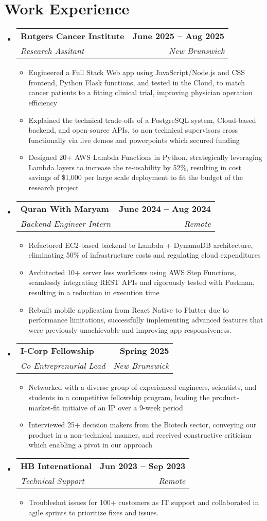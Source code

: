 \documentclass[letterpaper,11pt]{article}
\makeatletter
\newcommand{\resumeItem}[1]{
  \item\small{
    {#1 \vspace{0pt}}
  }
}
\newcommand{\resumeSubheading}[4]{
  \vspace{-2pt}\item
    \begin{tabular*}{1.0\textwidth}[t]{l@{\extracolsep{\fill}}r}
      \textbf{#1} & \textbf{\small #2} \\
      \textit{\small#3} & \textit{\small #4} \\
    \end{tabular*}\vspace{-7pt}
}
\newcommand{\resumeSubHeadingListStart}{\begin{itemize}[leftmargin=0.0in, label={}]}
\newcommand{\resumeSubHeadingListEnd}{\end{itemize}}\vspace{0pt}
\newcommand{\resumeItemListStart}{\begin{itemize}}
\newcommand{\resumeItemListEnd}{\end{itemize}\vspace{-5pt}}
\makeatother
\begin{document}
\section{Work Experience}
    \resumeSubHeadingListStart
                \resumeSubheading{Rutgers Cancer Institute}{June 2025 -- Aug 2025}{Research Assitant}{New Brunswick} 
                \resumeItemListStart
                    \resumeItem{Engineered a Full Stack Web app using JavaScript/Node.js and CSS frontend, Python Flask functions, and tested in the Cloud, to match cancer patients to a fitting clinical trial, improving physician operation efficiency}
                    \resumeItem{Explained the technical trade-offs of a PostgreSQL system, Cloud-based backend, and open-source APIs, to non technical supervisors cross functionally via live demos and powerpoints which secured funding}
                    \resumeItem{Designed 20+ AWS Lambda Functions in Python, strategically leveraging Lambda layers to increase the re-usability by {52\%}, resulting in cost savings of {\$1,000} per large scale deployment to fit the budget of the research project}
                    \resumeItemListEnd
            \resumeSubheading{Quran With Maryam}{June 2024 -- Aug 2024}{Backend Engineer Intern}{Remote} 
                \resumeItemListStart
                    \resumeItem{Refactored EC2-based backend to Lambda + DynamoDB architecture, eliminating {50\%} of infrastructure costs and regulating cloud expenditures}
                    \resumeItem{Architected 10+ server less workflows using AWS Step Functions, seamlessly integrating REST APIs and rigorously tested with Postman, resulting in a reduction in execution time}
                    \resumeItem{Rebuilt mobile application from React Native to Flutter due to performance limitations, successfully implementing advanced features that were previously unachievable and improving app responsiveness.}
                    \resumeItemListEnd
            \resumeSubheading{I-Corp Fellowship}{Spring 2025}{Co-Entreprenurial Lead}{New Brunswick} 
                \resumeItemListStart
                    \resumeItem{Networked with a diverse group of experienced engineers, scientists, and students in a competitive fellowship program, leading the product-market-fit initiaive of an IP over a 9-week period}
                    \resumeItem{Interviewed 25+ decision makers from the Biotech sector, conveying our product in a non-technical manner, and received constructive criticism which enabling a pivot in our approach}
                    \resumeItemListEnd
            \resumeSubheading{HB International}{Jun 2023 -- Sep 2023}{Technical Support}{Remote}
                \resumeItemListStart
                    \resumeItem{Troubleshot issues for 100+ customers as IT support and collaborated in agile sprints to prioritize fixes and issues.}
                    \resumeItemListEnd
    \resumeSubHeadingListEnd
    \vspace{-12pt}
\end{document}
